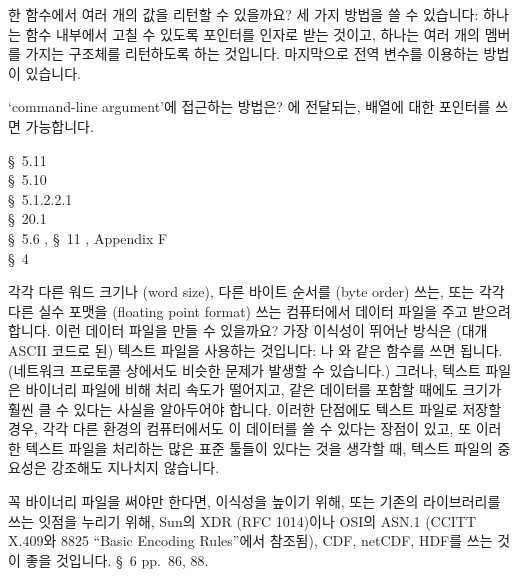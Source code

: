 \begin{faq}
	한 함수에서 여러 개의 값을 리턴할 수 있을까요?
\A
	세 가지 방법을 쓸 수 있습니다: 하나는 함수 내부에서 고칠 수 있도록
	포인터를 인자로 받는 것이고, 하나는 여러 개의 멤버를 가지는
	구조체를 리턴하도록 하는 것입니다.  마지막으로 전역 변수를
	이용하는 방법이 있습니다.  
\end{faq}

\begin{faq}
	`command-line argument'에 접근하는 방법은?
\A
	에 전달되는,  배열에 대한 포인터를 쓰면
	가능합니다.  

\R
	\cite{kr1} \S\ 5.11  \\
	\cite{kr2} \S\ 5.10  \\
	\cite{c89} \S\ 5.1.2.2.1 \\
	\cite{hs} \S\ 20.1  \\
	\cite{pcs} \S\ 5.6 , \S\ 11 ,
		 Appendix F \\
	\cite{swsolution} \S\ 4 
\end{faq}

\begin{faq}
	각각 다른 워드 크기나 (word size), 다른 바이트 순서를 (byte order)
	쓰는, 또는 각각 다른 실수 포맷을 (floating point format) 쓰는
	컴퓨터에서 데이터 파일을 주고 받으려 합니다.  이런 데이터 파일을
	만들 수 있을까요?
\A
	가장 이식성이 뛰어난 방식은 (대개 ASCII 코드로 된) 텍스트 파일을
	사용하는 것입니다: 나 와 같은 함수를
	쓰면 됩니다.  (네트워크 프로토콜 상에서도 비슷한 문제가 발생할 수
	있습니다.)
	그러나, 텍스트 파일은 바이너리 파일에 비해 처리 속도가 떨어지고,
	같은 데이터를 포함할 때에도 크기가 훨씬 클 수 있다는 사실을
	알아두어야 합니다.  이러한 단점에도 텍스트 파일로 저장할 경우,
	각각 다른 환경의 컴퓨터에서도 이 데이터를 쓸 수 있다는 장점이
	있고, 또 이러한 텍스트 파일을 처리하는 많은 표준 툴들이 있다는
	것을 생각할 때, 텍스트 파일의 중요성은 강조해도 지나치지 않습니다.

	꼭 바이너리 파일을 써야만 한다면, 이식성을 높이기 위해, 또는
	기존의 라이브러리를 쓰는 잇점을 누리기 위해, Sun의 XDR (RFC 1014)이나
	OSI의 ASN.1 (CCITT X.409와 \cite{c89} 8825 ``Basic Encoding Rules''에서
	참조됨), CDF, netCDF, HDF를 쓰는 것이 좋을 것입니다.
\R
	\cite{pcs} \S\ 6 pp.\ 86, 88.
\end{faq}

